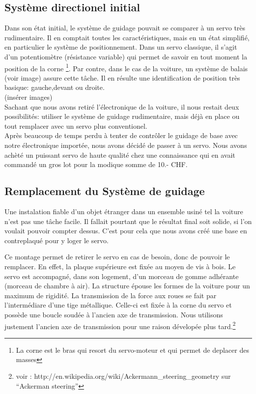 \documentclass[a4paper,11pt]{report}
\begin{document}
{\subsection{Système directionel initial}
Dans son \'etat initial, le syst\`eme de guidage pouvait se comparer \`a un
servo tr\`es rudimentaire. Il en comptait toutes les caractéristiques, mais en
un état simplifié, en particulier le système de positionnement. Dans un servo
classique, il s'agit d'un potentiomètre (résistance variable) qui permet
de savoir en tout moment la position de la corne \footnote{La corne est le bras qui resort du servo-moteur et qui permet de deplacer des masses}. Par contre, dans le cas de
la voiture, un système de balais (voir image) assure cette tâche. Il en
résulte une identification de position très basique: gauche,devant ou
droite.\\
(ins\'erer images)\\
Sachant que nous avons retir\'e l'\'electronique de la voiture, il nous restait
deux possibilit\'es: utiliser le syst\`eme de guidage rudimentaire, mais
d\'ej\`a en place ou tout remplacer avec un servo plus conventionel.\\
Apr\`es beaucoup de temps perdu \`a tenter de contr\^oler le guidage de base
avec notre \'electronique import\'ee, nous avons d\'ecidé de passer \`a un servo. Nous avons
ach\`eté un puissant servo de haute qualit\'e chez une connaissance qui en
avait command\'e un gros lot pour la modique somme de 10.- CHF.

\subsection{Remplacement du Système de guidage}
Une instalation fiable d'un objet \'etranger dans un ensemble usin\'e tel la
voiture n'est pas une t\^ache facile. Il fallait pourtant que le r\'esultat final
soit solide, si l'on voulait pouvoir compter dessus. C'est pour cela que nous avons
cr\'e\'e une base en contreplaqu\'e pour y loger le servo.

Ce montage permet de retirer le servo en cas de besoin, donc de pouvoir le
remplacer. En effet, la plaque sup\'erieure est fix\'ee au moyen de vis \`a
bois. Le servo est accompagn\'e, dans son logement, d'un morceau de gomme
adh\'erante (morceau de chambre \`a air). La structure \'epouse les formes de
la voiture pour un maximum de rigidit\'e. La transmission de la force aux
roues se fait par l'interm\'ediare d'une tige métallique. Celle-ci est
fix\'ee \`a la corne du servo et possède une boucle soud\'ee \`a l'ancien axe de
transmission. Nous utilisons justement l'ancien axe de transmission pour une
raison d\'evelop\'ee plus tard.\footnote{voir :
http://en.wikipedia.org/wiki/Ackermann\_steering\_geometry sur
``Ackerman steering''}

}
\end{document}
